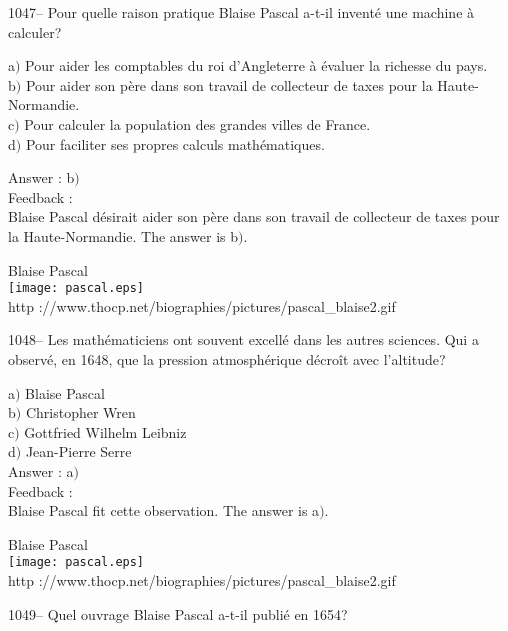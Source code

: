 ﻿\documentclass[letterpaper, 12pt]{article}
\begin{document}
1047-- Pour quelle raison pratique Blaise Pascal a-t-il invent\'e
une machine \`a calculer?

a$)$ Pour aider les comptables du roi d'Angleterre \`a \'evaluer la richesse
du pays.   \\
b$)$ Pour aider son p\`ere dans son travail de collecteur de taxes pour la
Haute-Normandie.  \\
c$)$ Pour calculer la population des grandes villes de France. \\
d$)$ Pour faciliter ses propres calculs math\'ematiques.

Answer : b$)$\\

Feedback : \\
Blaise Pascal d\'esirait aider son p\`ere dans son travail de
collecteur de taxes pour la Haute-Normandie.
The answer is b$)$.\\

        \begin{center}
        Blaise Pascal\\
    \texttt{[image: pascal.eps]}\\
        {\footnotesize http
://www.thocp.net/biographies/pictures/pascal\_blaise2.gif}
    \end{center}

1048-- Les math\'ematiciens ont souvent excell\'e dans les autres
sciences. Qui a observ\'e, en 1648, que la pression atmosph\'erique
d\'ecro\^it avec l'altitude?

a$)$ Blaise Pascal \\
b$)$ Christopher Wren   \\
c$)$ Gottfried Wilhelm Leibniz  \\
d$)$ Jean-Pierre Serre \\

Answer : a$)$\\

Feedback : \\
Blaise Pascal fit cette observation.
The answer is a$)$.\\

        \begin{center}
        Blaise Pascal\\
    \texttt{[image: pascal.eps]}\\
        {\footnotesize http
://www.thocp.net/biographies/pictures/pascal\_blaise2.gif}
    \end{center}

1049-- Quel ouvrage Blaise Pascal a-t-il publi\'e en 1654?
\end{document}
